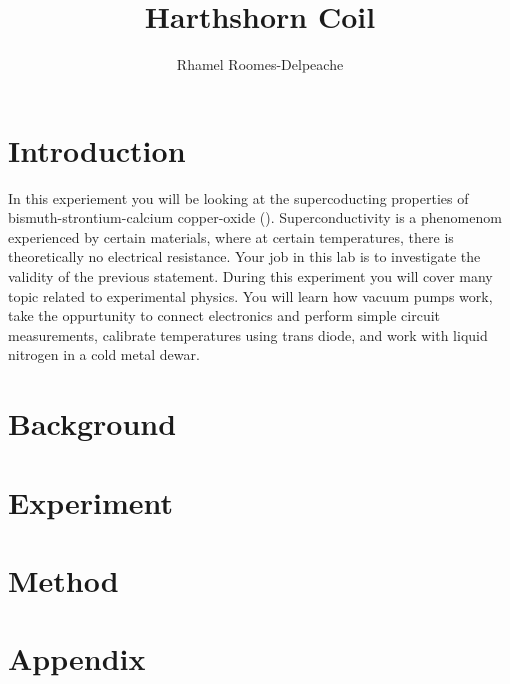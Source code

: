 \documentclass{apl-guide}
\title{Harthshorn Coil}
\author{Rhamel Roomes-Delpeache}
\begin{document}
\maketitle
\tableofcontents
\section{Introduction}
In this experiement you will be looking at the supercoducting properties of
bismuth-strontium-calcium copper-oxide (). Superconductivity is a
phenomenom experienced by certain materials, where at certain temperatures,
there is theoretically no electrical resistance. Your job in this lab is to
investigate the validity of the previous statement. During this experiment you
will cover many topic related to experimental physics. You will learn how vacuum
pumps work, take the oppurtunity to connect electronics and perform simple
circuit measurements, calibrate temperatures using trans diode, and work with
liquid nitrogen in a cold metal dewar. 

\section{Background}
\lipsum[1-1]

\section{Experiment}
\lipsum[1-1]

\section{Method}
\lipsum[1-1]

\section{Appendix}

\lipsum[1-1]
\end{document}
